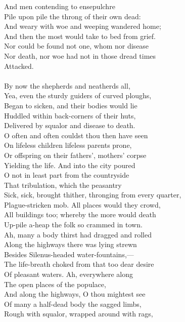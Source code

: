 And men contending to ensepulchre\\
Pile upon pile the throng of their own dead:\\
And weary with woe and weeping wandered home;\\
And then the most would take to bed from grief.\\
Nor could be found not one, whom nor disease\\
Nor death, nor woe had not in those dread times\\
Attacked.\\
\\
By now the shepherds and neatherds all,\\
Yea, even the sturdy guiders of curved ploughs,\\
Began to sicken, and their bodies would lie\\
Huddled within back-corners of their huts,\\
Delivered by squalor and disease to death.\\
O often and often couldst thou then have seen\\
On lifeless children lifeless parents prone,\\
Or offspring on their fathers', mothers' corpse\\
Yielding the life. And into the city poured\\
O not in least part from the countryside\\
That tribulation, which the peasantry\\
Sick, sick, brought thither, thronging from every quarter,\\
Plague-stricken mob. All places would they crowd,\\
All buildings too; whereby the more would death\\
Up-pile a-heap the folk so crammed in town.\\
Ah, many a body thirst had dragged and rolled\\
Along the highways there was lying strewn\\
Besides Silenus-headed water-fountains,—\\
The life-breath choked from that too dear desire\\
Of pleasant waters. Ah, everywhere along\\
The open places of the populace,\\
And along the highways, O thou mightest see\\
Of many a half-dead body the sagged limbs,\\
Rough with squalor, wrapped around with rags,\\
